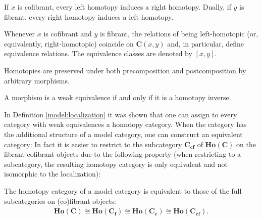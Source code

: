     \begin{property}
        If $x$ is cofibrant, every left homotopy induces a right homotopy. Dually, if $y$ is fibrant, every right homotopy induces a left homotopy.
    \end{property}
    \begin{result}
        Whenever $x$ is cofibrant and $y$ is fibrant, the relations of being left-homotopic (or, equivalently, right-homotopic) coincide on $\mathbf{C}(x,y)$ and, in particular, define equivalence relations. The equivalence classes are denoted by $[x,y]$.
    \end{result}

    \begin{property}
        Homotopies are preserved under both precomposition and postcomposition by arbitrary morphisms.
    \end{property}
    \begin{property}
        A morphism is a weak equivalence if and only if it is a homotopy inverse.
    \end{property}


    In Definition \ref{model:localization} it was shown that one can assign to every category with weak equivalences a homotopy category. When the category has the additional structure of a model category, one can construct an equivalent category:
    In fact it is easier to restrict to the subcategory $\mathbf{C_{cf}}$ of $\mathbf{Ho(C)}$ on the fibrant-cofibrant objects due to the following property (when restricting to a subcategory, the resulting homotopy category is only equivalent and not isomorphic to the localization):
    \begin{property}
        The homotopy category of a model category is equivalent to those of the full subcategories on (co)fibrant objects:
        \begin{gather}
            \mathbf{Ho(C)}\cong\mathbf{Ho(C_f)}\cong\mathbf{Ho(C_c)}\cong\mathbf{Ho(C_{cf})}.
        \end{gather}
    \end{property}

